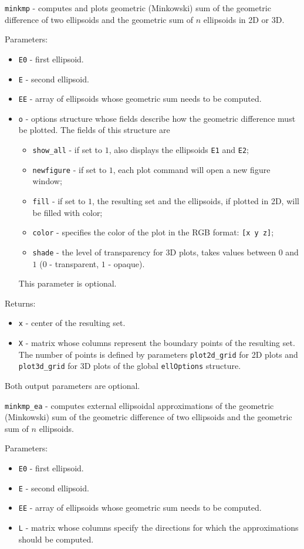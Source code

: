 \documentclass{report}
\begin{document}
\newpage

{\Large {\tt minkmp}} - computes and plots geometric (Minkowski) sum of the
geometric difference of two ellipsoids and the geometric sum of $n$ ellipsoids
in 2D or 3D.

Parameters:
\begin{itemize}
\item {\tt E0} - first ellipsoid.
\item {\tt E} - second ellipsoid.
\item {\tt EE} - array of ellipsoids whose geometric sum needs to be computed.
\item {\tt o} - options structure whose fields describe how the geometric
difference must be plotted. The fields of this structure are
\begin{itemize}
\item {\tt show\_all} - if set to $1$, also displays the ellipsoids
{\tt E1} and {\tt E2};
\item {\tt newfigure} - if set to $1$, each plot command will open a new
figure window;
\item {\tt fill} - if set to $1$, the resulting set and the ellipsoids,
if plotted in 2D, will be filled with color;
\item {\tt color} - specifies the color of the plot in the RGB format:
{\tt [x y z]};
\item {\tt shade} - the level of transparency for 3D plots, takes values
between $0$ and $1$ ($0$ - transparent, $1$ - opaque).
\end{itemize}
This parameter is optional.
\end{itemize}

Returns:
\begin{itemize}
\item {\tt x} - center of the resulting set.
\item {\tt X} - matrix whose columns represent the boundary points of the
resulting set. The number of points is defined by parameters
{\tt plot2d\_grid} for 2D plots and {\tt plot3d\_grid} for 3D plots of the
global {\tt ellOptions} structure.
\end{itemize}
Both output parameters are optional.

\newpage

{\Large {\tt minkmp\_ea}} - computes external ellipsoidal approximations
of the geometric (Minkowski) sum of the geometric difference of two ellipsoids
and the geometric sum of $n$ ellipsoids.

Parameters:
\begin{itemize}
\item {\tt E0} - first ellipsoid.
\item {\tt E} - second ellipsoid.
\item {\tt EE} - array of ellipsoids whose geometric sum needs to be computed.
\item {\tt L} - matrix whose columns specify the directions for which
the approximations should be computed.
\end{itemize}
\end{document}
